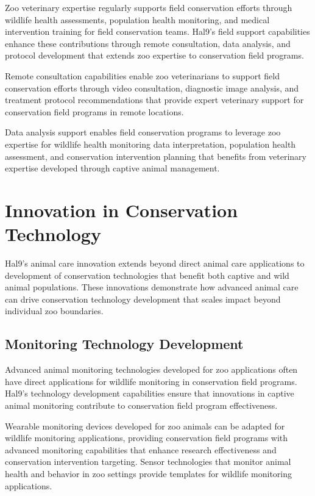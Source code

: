 \documentclass[
  Letterpaper,
]{scrbook}
\begin{document}
Zoo veterinary expertise regularly supports field conservation efforts
through wildlife health assessments, population health monitoring, and
medical intervention training for field conservation teams. Hal9's field
support capabilities enhance these contributions through remote
consultation, data analysis, and protocol development that extends zoo
expertise to conservation field programs.

Remote consultation capabilities enable zoo veterinarians to support
field conservation efforts through video consultation, diagnostic image
analysis, and treatment protocol recommendations that provide expert
veterinary support for conservation field programs in remote locations.

Data analysis support enables field conservation programs to leverage
zoo expertise for wildlife health monitoring data interpretation,
population health assessment, and conservation intervention planning
that benefits from veterinary expertise developed through captive animal
management.

\section{Innovation in Conservation
Technology}\label{innovation-in-conservation-technology}

Hal9's animal care innovation extends beyond direct animal care
applications to development of conservation technologies that benefit
both captive and wild animal populations. These innovations demonstrate
how advanced animal care can drive conservation technology development
that scales impact beyond individual zoo boundaries.

\subsection{Monitoring Technology
Development}\label{monitoring-technology-development}

Advanced animal monitoring technologies developed for zoo applications
often have direct applications for wildlife monitoring in conservation
field programs. Hal9's technology development capabilities ensure that
innovations in captive animal monitoring contribute to conservation
field program effectiveness.

Wearable monitoring devices developed for zoo animals can be adapted for
wildlife monitoring applications, providing conservation field programs
with advanced monitoring capabilities that enhance research
effectiveness and conservation intervention targeting. Sensor
technologies that monitor animal health and behavior in zoo settings
provide templates for wildlife monitoring applications.
\end{document}
